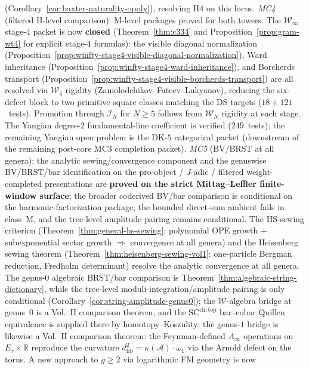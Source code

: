 \begin{remark}
(Corollary~\ref{cor:baxter-naturality-opoly}), resolving H4 on
this locus.
\emph{MC4} (filtered H-level comparison): M-level packages proved
for both towers. The $\mathcal{W}_\infty$ stage-$4$ packet is now
\textbf{closed} (Theorem~\ref{thm:c334} and
Proposition~\ref{prop:gram-wt4} for explicit stage-$4$ formulas): the visible diagonal normalization
(Proposition~\ref{prop:winfty-stage4-visible-diagonal-normalization}),
Ward inheritance
(Proposition~\ref{prop:winfty-stage4-ward-inheritance}), and Borcherds
transport
(Proposition~\ref{prop:winfty-stage4-visible-borcherds-transport}) are
all resolved via $\mathcal{W}_4$ rigidity
(Zamolodchikov--Fateev--Lukyanov), reducing the six-defect block to two
primitive square classes matching the DS targets
($18+121$~tests). Promotion through $\mathcal{I}_N$ for $N\ge5$
follows from $\mathcal{W}_N$ rigidity at each stage. The Yangian
degree-$2$ fundamental-line coefficient is verified ($249$~tests);
the remaining Yangian open problem is the DK-$5$ categorical packet
(downstream of the remaining post-core MC3 completion packet).
\emph{MC5} (BV/BRST at all genera): the analytic sewing/convergence
component and the genuswise BV/BRST/bar identification on the
pro-object / $J$-adic / filtered weight-completed presentations are
\textbf{proved on the strict Mittag--Leffler finite-window surface};
the broader coderived BV/bar comparison is conditional on the
harmonic-factorization package, the bounded direct-sum ambient fails in
class~M, and the tree-level amplitude pairing remains conditional.
The HS-sewing criterion
(Theorem~\ref{thm:general-hs-sewing}: polynomial OPE growth
$+$ subexponential sector growth $\Longrightarrow$ convergence
at all genera) and the Heisenberg sewing theorem
(Theorem~\ref{thm:heisenberg-sewing-vol1}: one-particle Bergman
reduction, Fredholm determinant) resolve the analytic
convergence at all genera.
The genus-$0$ algebraic BRST/bar comparison is
Theorem~\ref{thm:algebraic-string-dictionary}, while the tree-level
moduli-integration/amplitude pairing is only conditional
\textup{(}Corollary~\ref{cor:string-amplitude-genus0}\textup{)}; the
$\mathcal{W}$-algebra bridge at genus~$0$ is a Vol.~II comparison
theorem, and the $\mathrm{SC}^{\mathrm{ch,top}}$ bar--cobar Quillen
equivalence is supplied there by homotopy--Koszulity; the genus-$1$
bridge is likewise a Vol.~II comparison theorem: the Feynman-defined
$A_\infty$ operations on $E_\tau \times \mathbb{R}$ reproduce
the curvature $d_{\mathrm{fib}}^2 = \kappa(\mathcal{A})
\cdot \omega_1$ via the Arnold defect on the torus.
A new approach to $g \geq 2$ via logarithmic FM geometry is now

\end{remark}
